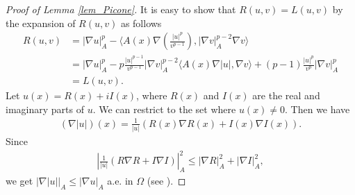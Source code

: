 \documentclass[a4paper,12pt,reqno]{amsart}
\theoremstyle{theorem}
\numberwithin{equation}{section}
\theoremstyle{plain}
\theoremstyle{definition}
\theoremstyle{defi}
\begin{document}
\begin{proof}[Proof of Lemma \ref{lem_Picone}]
	It is easy to show that $R(u,v)=L(u,v)$ by the expansion of $R(u,v)$ as follows
	\begin{align*}
	R(u,v) &= |\nabla u|^p_A - \langle A(x)\nabla\left(\frac{|u|^p}{v^{p-1}} \right),|\nabla v|^{p-2}_A\nabla v \rangle \\
	& = |\nabla u|^p_A -p\frac{|u|^{p-1} }{v^{p-1}}|\nabla v|^{p-2}_A \langle A(x) \nabla|u|, \nabla v\rangle + (p-1)\frac{|u|^p}{v^p}|\nabla v|^p_A\\
	& =  L(u,v).
	\end{align*}
	Let $u(x)=R(x)+iI(x)$, where $R(x)$ and $I(x)$ are the real and imaginary parts of $u$. We can restrict to the set where $u(x)\neq 0$. Then we have
	\begin{align}
	(\nabla |u|)(x) = \frac{1}{|u|} (R(x)\nabla R(x)+ I(x) \nabla I(x)).
	\end{align}
	Since
	\begin{align*}
	\left| \frac{1}{|u|} (R\nabla R+ I \nabla I) \right|^2_A \leq |\nabla R|^2_A + |\nabla I|^2_A,
	\end{align*}
	we get $|\nabla |u||_A\leq |\nabla u|_A$ a.e. in $\Omega$ (see \cite[Theorem 2.1]{RSS_revista}). 
	

\end{proof}
\end{document}
